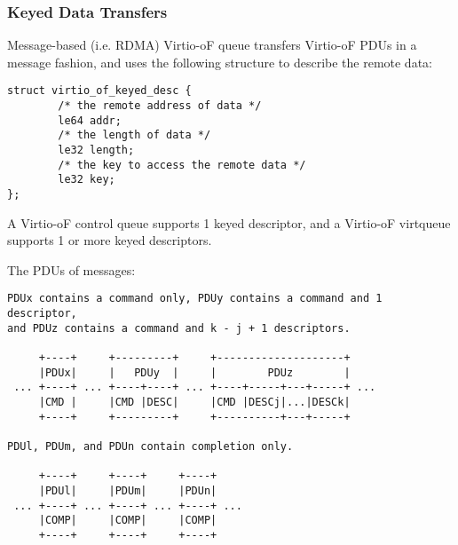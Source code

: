 \subsubsection{Keyed Data Transfers}\label{sec:Virtio Transport Options / Virtio Over Fabrics / Protocol Data Unit/ Keyed Data Transfers}
Message-based (i.e. RDMA) Virtio-oF queue transfers Virtio-oF PDUs in a message fashion, and uses the following structure to describe the remote data:

\begin{lstlisting}
struct virtio_of_keyed_desc {
        /* the remote address of data */
        le64 addr;
        /* the length of data */
        le32 length;
        /* the key to access the remote data */
        le32 key;
};
\end{lstlisting}

A Virtio-oF control queue supports 1 keyed descriptor, and a Virtio-oF virtqueue supports 1 or more keyed descriptors.

The PDUs of messages:
\begin{lstlisting}
PDUx contains a command only, PDUy contains a command and 1 descriptor,
and PDUz contains a command and k - j + 1 descriptors.

     +----+     +---------+     +--------------------+
     |PDUx|     |   PDUy  |     |        PDUz        |
 ... +----+ ... +----+----+ ... +----+-----+---+-----+ ...
     |CMD |     |CMD |DESC|     |CMD |DESCj|...|DESCk|
     +----+     +---------+     +----------+---+-----+

PDUl, PDUm, and PDUn contain completion only.

     +----+     +----+     +----+
     |PDUl|     |PDUm|     |PDUn|
 ... +----+ ... +----+ ... +----+ ...
     |COMP|     |COMP|     |COMP|
     +----+     +----+     +----+
\end{lstlisting}
